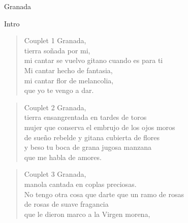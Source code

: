 \begin{song}[vals]{Granada}
\begin{instrumental}{Intro}
\end{instrumental}

\begin{verse}{Couplet 1}
Granada,\\
\chord{\_\_\_\_\_\_\_\_\_\_\_\_\_\_}tierra soñada por mi,\\
\chord{\_\_\_\_\_\_\_\_\_\_\_\_\_\_\_\_\_}mi cantar se vuelvo gitano cuando es para ti\\
Mi cantar hecho de fantasia,\\
mi cantar flor de melancolia,\\
que yo te vengo a dar.\\
\end{verse}

\begin{verse}{Couplet 2}
Granada,\\
tierra \hspace{1em} ensangrentada en tardes de toros\\
mujer que conserva el embrujo de los o\chord{$\downarrow$}jos moros \\
de sueño rebelde y gitana cubierta \chord{$\downarrow$}de flores\\
y beso tu boca de grana jugosa manzana\\
que me habla de amores.\\
\end{verse}

\begin{verse}{Couplet 3}
Granada,\\
manola cantada en coplas \chord{$\downarrow$}\hspace{0.5em} preciosas.\\
No tengo otra cosa que darte que un ramo \chord{$\downarrow$}\hspace{0.5em} de rosas\\
de rosas de suave fragancia\\
que le dieron marco a la Virgen morena,  \\
\end{verse}


\end{song}
